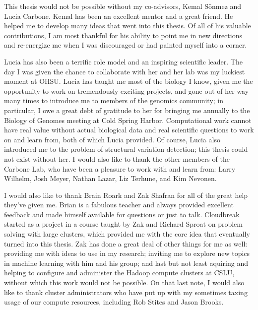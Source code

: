 \documentclass [11pt] {report}
\newcommand{\ignore}[1]{}
\begin{document}
\ignore{\prefacesection{Dedication}
\vfill
\begin{center}
\end{center}
\vfill
}
%
\vfill
\indent This thesis would not be possible without my co-advisors, Kemal S\"onmez and Lucia Carbone. Kemal has been an excellent mentor and a great friend. He helped me to develop many ideas that went into this thesis. Of all of his valuable contributions, I am most thankful for his ability to point me in new directions and re-energize me when I was discouraged or had painted myself into a corner. 

Lucia has also been a terrific role model and an inspiring scientific leader. The day I was given the chance to collaborate with her and her lab was my luckiest moment at OHSU. Lucia has taught me most of the biology I know, given me the opportunity to work on tremendously exciting projects, and gone out of her way many times to introduce me to members of the genomics community; in particular, I owe a great debt of gratitude to her for bringing me annually to the Biology of Genomes meeting at Cold Spring Harbor. Computational work cannot have real value without actual biological data and real scientific questions to work on and learn from, both of which Lucia provided. Of course, Lucia also introduced me to the problem of structural variation detection; this thesis could not exist without her. I would also like to thank the other members of the Carbone Lab, who have been a pleasure to work with and learn from: Larry Wilhelm, Josh Meyer, Nathan Lazar, Liz Terhune, and Kim Nevonen.

I would also like to thank Brain Roark and Zak Shafran for all of the great help they've given me. Brian is a fabulous teacher and always provided excellent feedback and made himself available for questions or just to talk. Cloudbreak started as a project in a course taught by Zak and Richard Sproat on problem solving with large clusters, which provided me with the core idea that eventually turned into this thesis. Zak has done a great deal of other things for me as well: providing me with ideas to use in my research; inviting me to explore new topics in machine learning with him and his group; and last but not least aquiring and helping to configure and administer the Hadoop compute clusters at CSLU, without which this work would not be possible. On that last note, I would also like to thank cluster administrators who have put up with my sometimes taxing usage of our compute resources, including Rob Stites and Jason Brooks.
\end{document}
